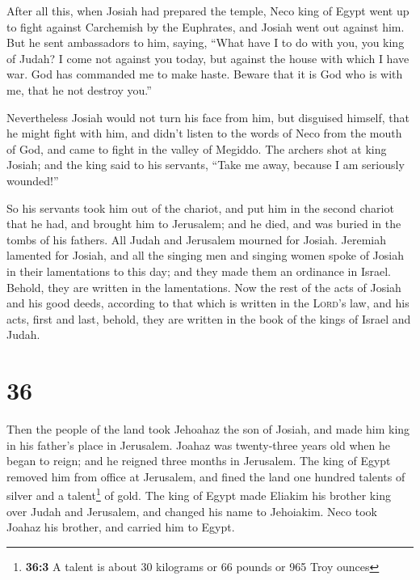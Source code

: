  After all this, when Josiah had prepared the temple,
Neco king of Egypt went up to fight against Carchemish by the Euphrates,
and Josiah went out against him.  But he sent ambassadors
to him, saying, ``What have I to do with you, you king of Judah? I come
not against you today, but against the house with which I have war. God
has commanded me to make haste. Beware that it is God who is with me,
that he not destroy you.''

 Nevertheless Josiah would not turn his face from him,
but disguised himself, that he might fight with him, and didn't listen
to the words of Neco from the mouth of God, and came to fight in the
valley of Megiddo.  The archers shot at king Josiah; and
the king said to his servants, ``Take me away, because I am seriously
wounded!''

 So his servants took him out of the chariot, and put him
in the second chariot that he had, and brought him to Jerusalem; and he
died, and was buried in the tombs of his fathers. All Judah and
Jerusalem mourned for Josiah.  Jeremiah lamented for
Josiah, and all the singing men and singing women spoke of Josiah in
their lamentations to this day; and they made them an ordinance in
Israel. Behold, they are written in the lamentations. 
Now the rest of the acts of Josiah and his good deeds, according to that
which is written in the \textsc{Lord}'s law,  and his
acts, first and last, behold, they are written in the book of the kings
of Israel and Judah.

\hypertarget{section-35}{%
\section{36}\label{section-35}}

 Then the people of the land took Jehoahaz the son of
Josiah, and made him king in his father's place in Jerusalem.
 Joahaz was twenty-three years old when he began to reign;
and he reigned three months in Jerusalem.  The king of
Egypt removed him from office at Jerusalem, and fined the land one
hundred talents of silver and a talent\footnote{\textbf{36:3} A talent
  is about 30 kilograms or 66 pounds or 965 Troy ounces} of gold.
 The king of Egypt made Eliakim his brother king over
Judah and Jerusalem, and changed his name to Jehoiakim. Neco took Joahaz
his brother, and carried him to Egypt.

